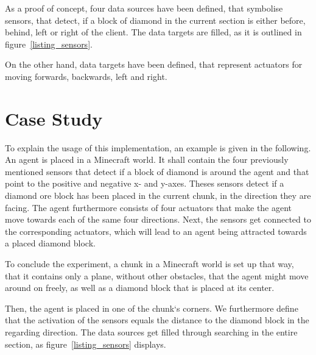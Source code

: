 As a proof of concept, four data sources have been defined, that symbolise sensors, that detect, if a block of diamond in the current section is either before, behind, left or right of the client. The data targets are filled, as it is outlined in figure~\ref{listing_sensors}.

On the other hand, data targets have been defined, that represent actuators for moving forwards, backwards, left and right.

    \section{Case Study}
    


    
To explain the usage of this implementation, an example is given in the following. An agent is placed in a Minecraft world. It shall contain the four previously mentioned sensors that detect if a block of diamond is around the agent and that point to the positive and negative x- and y-axes. Theses sensors detect if a diamond ore block has been placed in the current chunk, in the direction they are facing. The agent furthermore consists of four actuators that make the agent move towards each of the same four directions. Next, the sensors get connected to the corresponding actuators, which will lead to an agent being attracted towards a placed diamond block.

To conclude the experiment, a chunk in a Minecraft world is set up that way, that it contains only a plane, without other obstacles, that the agent might move around on freely, as well as a diamond block that is placed at its center. 


Then, the agent is placed in one of the chunk`s corners. We furthermore define that the activation of the sensors equals the distance to the diamond block in the regarding direction. The data sources get filled through searching in the entire section, as figure~\ref{listing_sensors} displays.

